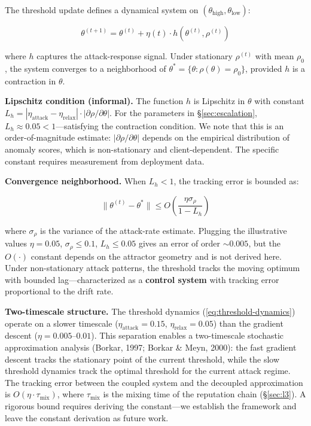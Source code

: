 \documentclass[10pt,journal]{IEEEtran}
\begin{document}
The threshold update defines a dynamical system on $(\theta_{\text{high}}, \theta_{\text{low}})$:

\begin{equation}
\theta^{(t+1)} = \theta^{(t)} + \eta(t) \cdot h(\theta^{(t)}, \rho^{(t)})
\label{eq:threshold-dynamics}
\end{equation}

where $h$ captures the attack-response signal. Under stationary $\rho^{(t)}$ with mean $\rho_0$, the system converges to a neighborhood of $\theta^* = \{\theta : \rho(\theta) = \rho_0\}$, provided $h$ is a contraction in $\theta$.

\textbf{Lipschitz condition (informal).} The function $h$ is Lipschitz in $\theta$ with constant $L_h = |\eta_{\text{attack}} - \eta_{\text{relax}}| \cdot |\partial\rho/\partial\theta|$. For the parameters in \S\ref{sec:escalation}, $L_h \approx 0.05 < 1$---satisfying the contraction condition. We note that this is an order-of-magnitude estimate: $|\partial\rho/\partial\theta|$ depends on the empirical distribution of anomaly scores, which is non-stationary and client-dependent. The specific constant requires measurement from deployment data.

\textbf{Convergence neighborhood.} When $L_h < 1$, the tracking error is bounded as:

\begin{equation}
\|\theta^{(t)} - \theta^*\| \le O\!\left(\frac{\eta \sigma_\rho}{1 - L_h}\right)
\label{eq:tracking-error}
\end{equation}

where $\sigma_\rho$ is the variance of the attack-rate estimate. Plugging the illustrative values $\eta = 0.05$, $\sigma_\rho \le 0.1$, $L_h \le 0.05$ gives an error of order $\sim 0.005$, but the $O(\cdot)$ constant depends on the attractor geometry and is not derived here. Under non-stationary attack patterns, the threshold tracks the moving optimum with bounded lag---characterized as a \textbf{control system} with tracking error proportional to the drift rate.

\textbf{Two-timescale structure.} The threshold dynamics (\ref{eq:threshold-dynamics}) operate on a slower timescale ($\eta_{\text{attack}} = 0.15$, $\eta_{\text{relax}} = 0.05$) than the gradient descent ($\eta = 0.005$--$0.01$). This separation enables a two-timescale stochastic approximation analysis (Borkar, 1997; Borkar \& Meyn, 2000): the fast gradient descent tracks the stationary point of the current threshold, while the slow threshold dynamics track the optimal threshold for the current attack regime. The tracking error between the coupled system and the decoupled approximation is $O(\eta \cdot \tau_{\text{mix}})$, where $\tau_{\text{mix}}$ is the mixing time of the reputation chain (\S\ref{sec:l3}). A rigorous bound requires deriving the constant---we establish the framework and leave the constant derivation as future work.
\end{document}
